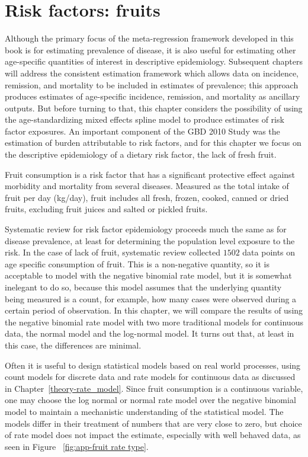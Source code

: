 \chapter{Risk factors: fruits}
\label{applications-log_normal}

Although the primary focus of the meta-regression framework developed
in this book is for estimating prevalence of disease, it is also
useful for estimating other age-specific quantities of interest in
descriptive epidemiology.  Subsequent chapters will address the
consistent estimation framework which allows data on incidence,
remission, and mortality to be included in estimates of prevalence;
this approach produces estimates of age-specific incidence, remission,
and mortality as ancillary outputs.  But before turning to that,
this chapter considers the possibility of using the
age-standardizing mixed effects spline model to produce estimates of
risk factor exposures.  An important component of the GBD 2010 Study
was the estimation of burden attributable to risk factors, and for
this chapter we focus on the descriptive epidemiology of a
dietary risk factor, the lack of fresh fruit.

Fruit consumption is a risk factor that has a significant protective
effect against morbidity and mortality from several diseases.  
Measured as the total intake of fruit per day (kg/day), fruit
includes all fresh, frozen, cooked, canned or dried fruits, excluding
fruit juices and salted or pickled fruits. \cite{he_increased_2007,
  boeing_intake_2006}

Systematic review for
risk factor epidemiology proceeds much the same as for disease
prevalence, at least for determining the population level exposure to
the risk.  In the case of lack of fruit, systematic review collected
$1502$ data points on age specific consumption of fruit.
This is a non-negative quantity, so it is acceptable to model
with the negative binomial rate model, but it is somewhat inelegant to
do so, because this model assumes that the underlying quantity being
measured is a count, for example, how many cases were observed during a
certain period of observation.  In this chapter, we will compare the results of
using the negative binomial rate model with two more traditional
models for continuous data, the normal model and the log-normal model.
It turns out that, at least in this case, the differences are minimal.

Often it is useful to design statistical models based on real world
processes, using count models for discrete data and rate models for
continuous data as discussed in Chapter~\ref{theory-rate_model}.
Since fruit consumption is a continuous variable, one may choose the
log normal or normal rate model over the negative binomial model to
maintain a mechanistic understanding of the statistical model.  The
models differ in their treatment of numbers that are very close to
zero, but choice of rate model does not impact the estimate,
especially with well behaved data, as seen in Figure
~\ref{fig:app-fruit rate type}.

